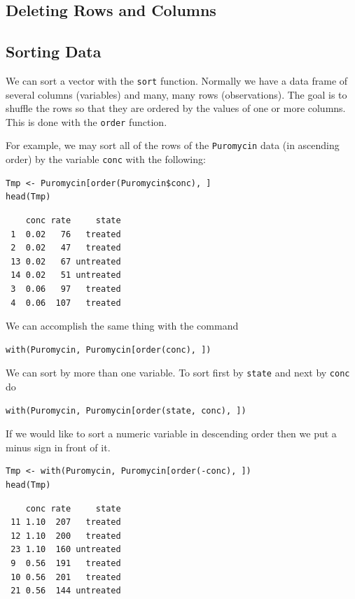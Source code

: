 \documentclass[captions=tableheading]{scrbook}
\begin{document}
\begin{example}
\subsection{Deleting Rows and Columns}
\label{sec-20-4-3}
\subsection{Sorting Data}
\label{sec-20-4-4}


We can sort a vector with the \texttt{sort} function. Normally we have a data frame of several columns (variables) and many, many rows (observations). The goal is to shuffle the rows so that they are ordered by the values of one or more columns. This is done with the \texttt{order} function. 

For example, we may sort all of the rows of the \texttt{Puromycin} data (in ascending order) by the variable \texttt{conc} with the following: 


\begin{verbatim}
Tmp <- Puromycin[order(Puromycin$conc), ]
head(Tmp)
\end{verbatim}

\begin{verbatim}
    conc rate     state
 1  0.02   76   treated
 2  0.02   47   treated
 13 0.02   67 untreated
 14 0.02   51 untreated
 3  0.06   97   treated
 4  0.06  107   treated
\end{verbatim}

We can accomplish the same thing with the command 


\begin{verbatim}
with(Puromycin, Puromycin[order(conc), ])
\end{verbatim}

We can sort by more than one variable. To sort first by \texttt{state} and next by \texttt{conc} do 


\begin{verbatim}
with(Puromycin, Puromycin[order(state, conc), ])
\end{verbatim}

If we would like to sort a numeric variable in descending order then we put a minus sign in front of it. 


\begin{verbatim}
Tmp <- with(Puromycin, Puromycin[order(-conc), ])
head(Tmp)
\end{verbatim}

\begin{verbatim}
    conc rate     state
 11 1.10  207   treated
 12 1.10  200   treated
 23 1.10  160 untreated
 9  0.56  191   treated
 10 0.56  201   treated
 21 0.56  144 untreated
\end{verbatim}


\end{example}
\end{document}
